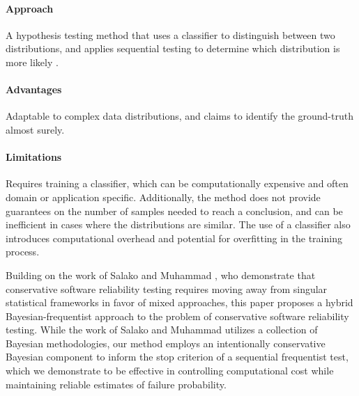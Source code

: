 
        \paragraph{Approach} A hypothesis testing method that uses a classifier to distinguish between two distributions, and applies sequential testing to determine which distribution is more likely \cite{hsu2026classifierbasednonparametricsequentialhypothesis}.

        \paragraph{Advantages} Adaptable to complex data distributions, and claims to identify the ground-truth almost surely.

        \paragraph{Limitations} Requires training a classifier, which can be computationally expensive and often domain or application specific. Additionally, the method does not provide guarantees on the number of samples needed to reach a conclusion, and can be inefficient in cases where the distributions are similar. The use of a classifier also introduces computational overhead and potential for overfitting in the training process.


        Building on the work of Salako and Muhammad \cite{salako2025conservativesoftwarereliabilityassessments}, who demonstrate that conservative software reliability testing requires moving away from singular statistical frameworks in favor of mixed approaches, this paper proposes a hybrid Bayesian-frequentist approach to the problem of conservative software reliability testing. While the work of Salako and Muhammad utilizes a collection of Bayesian methodologies, our method employs an intentionally conservative Bayesian component to inform the stop criterion of a sequential frequentist test, which we demonstrate to be effective in controlling computational cost while maintaining reliable estimates of failure probability.
